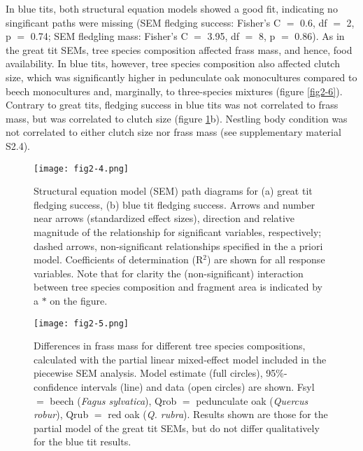 \documentclass[10pt, twoside]{book} %
\begin{document}
		In blue tits, both structural equation models showed a good fit, indicating no singificant paths were missing (SEM fledging success: Fisher's C $=$ 0.6, df $=$ 2, p $=$ 0.74; SEM fledgling mass: Fisher's C $=$ 3.95, df $=$ 8, p $=$ 0.86). As in the great tit SEMs, tree species composition affected frass mass, and hence, food availability. In blue tits, however, tree species composition also affected clutch size, which was significantly higher in pedunculate oak monocultures compared to beech monocultures and, marginally, to three-species mixtures (figure \ref{fig2-6}). Contrary to great tits, fledging success in blue tits was not correlated to frass mass, but was correlated to clutch size (figure \ref{fig2-4}b). Nestling body condition was not correlated to either clutch size nor frass mass (see supplementary material S2.4).\\

		
\begin{figure}[h!]
	\begin{center}
		\texttt{[image: fig2-4.png]}
	\end{center}
	\caption{Structural equation model (SEM) path diagrams for (a) great tit fledging success, (b) blue tit fledging success. Arrows and number near arrows (standardized effect sizes), direction and relative magnitude of the relationship for significant variables, respectively; dashed arrows, non-significant relationships specified in the a priori model. Coefficients of determination (R$^2$) are shown for all response variables. Note that for clarity the (non-significant) interaction between tree species composition and fragment area is indicated by a $\ast$ on the figure. \label{fig2-4}}
\end{figure}

\begin{figure}[h!]
	\begin{center}
		\texttt{[image: fig2-5.png]}
	\end{center}
	\caption{Differences in frass mass for different tree species compositions, calculated with the partial linear mixed-effect model included in the piecewise SEM analysis. Model estimate (full circles), 95\%-confidence intervals (line) and data (open circles) are shown. Fsyl $=$ beech (\textit{Fagus sylvatica}), Qrob $=$ pedunculate oak (\textit{Quercus robur}), Qrub $=$ red oak (\textit{Q. rubra}). Results shown are those for the partial model of the great tit SEMs, but do not differ qualitatively for the blue tit results. \label{fig2-5}}
\end{figure}
\end{document}
